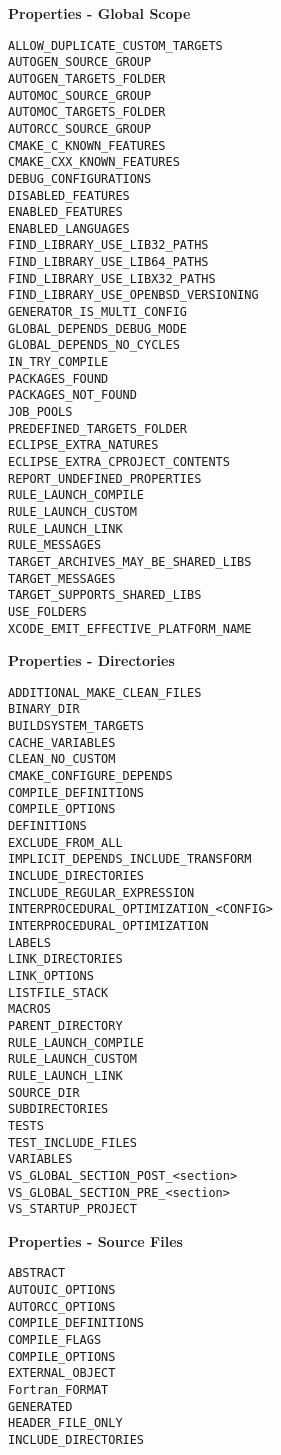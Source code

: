 \documentclass{article}
\begin{document}
\begin{minipage}[t]{0.18\linewidth}
\textbf{Properties - Global Scope}
\begin{verbatim}
ALLOW_DUPLICATE_CUSTOM_TARGETS
AUTOGEN_SOURCE_GROUP
AUTOGEN_TARGETS_FOLDER
AUTOMOC_SOURCE_GROUP
AUTOMOC_TARGETS_FOLDER
AUTORCC_SOURCE_GROUP
CMAKE_C_KNOWN_FEATURES
CMAKE_CXX_KNOWN_FEATURES
DEBUG_CONFIGURATIONS
DISABLED_FEATURES
ENABLED_FEATURES
ENABLED_LANGUAGES
FIND_LIBRARY_USE_LIB32_PATHS
FIND_LIBRARY_USE_LIB64_PATHS
FIND_LIBRARY_USE_LIBX32_PATHS
FIND_LIBRARY_USE_OPENBSD_VERSIONING
GENERATOR_IS_MULTI_CONFIG
GLOBAL_DEPENDS_DEBUG_MODE
GLOBAL_DEPENDS_NO_CYCLES
IN_TRY_COMPILE
PACKAGES_FOUND
PACKAGES_NOT_FOUND
JOB_POOLS
PREDEFINED_TARGETS_FOLDER
ECLIPSE_EXTRA_NATURES
ECLIPSE_EXTRA_CPROJECT_CONTENTS
REPORT_UNDEFINED_PROPERTIES
RULE_LAUNCH_COMPILE
RULE_LAUNCH_CUSTOM
RULE_LAUNCH_LINK
RULE_MESSAGES
TARGET_ARCHIVES_MAY_BE_SHARED_LIBS
TARGET_MESSAGES
TARGET_SUPPORTS_SHARED_LIBS
USE_FOLDERS
XCODE_EMIT_EFFECTIVE_PLATFORM_NAME
\end{verbatim}

\textbf{Properties - Directories}
\begin{verbatim}
ADDITIONAL_MAKE_CLEAN_FILES
BINARY_DIR
BUILDSYSTEM_TARGETS
CACHE_VARIABLES
CLEAN_NO_CUSTOM
CMAKE_CONFIGURE_DEPENDS
COMPILE_DEFINITIONS
COMPILE_OPTIONS
DEFINITIONS
EXCLUDE_FROM_ALL
IMPLICIT_DEPENDS_INCLUDE_TRANSFORM
INCLUDE_DIRECTORIES
INCLUDE_REGULAR_EXPRESSION
INTERPROCEDURAL_OPTIMIZATION_<CONFIG>
INTERPROCEDURAL_OPTIMIZATION
LABELS
LINK_DIRECTORIES
LINK_OPTIONS
LISTFILE_STACK
MACROS
PARENT_DIRECTORY
RULE_LAUNCH_COMPILE
RULE_LAUNCH_CUSTOM
RULE_LAUNCH_LINK
SOURCE_DIR
SUBDIRECTORIES
TESTS
TEST_INCLUDE_FILES
VARIABLES
VS_GLOBAL_SECTION_POST_<section>
VS_GLOBAL_SECTION_PRE_<section>
VS_STARTUP_PROJECT
\end{verbatim}

\textbf{Properties - Source Files}
\begin{verbatim}
ABSTRACT
AUTOUIC_OPTIONS
AUTORCC_OPTIONS
COMPILE_DEFINITIONS
COMPILE_FLAGS
COMPILE_OPTIONS
EXTERNAL_OBJECT
Fortran_FORMAT
GENERATED
HEADER_FILE_ONLY
INCLUDE_DIRECTORIES
\end{verbatim}

\end{minipage}
\hfill\vline\hfill
\end{document}
